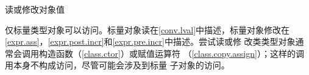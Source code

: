 读或修改对象值

\begin{note}
  \begin{sloppypar}
    仅标量类型对象可以访问。标量对象读在\ref{conv.lval}中描述，标量对象修改在
    \ref{expr.ass}，\ref{expr.post.incr}和\ref{expr.pre.incr}中描述。尝试读或修
    改类类型对象通常会调用构造函数（\ref{class.ctor}）或赋值运算符
    （\ref{class.copy.assign}）；这样的调用本身不构成访问，尽管可能会涉及到标量
    子对象的访问。
  \end{sloppypar}
\end{note}
